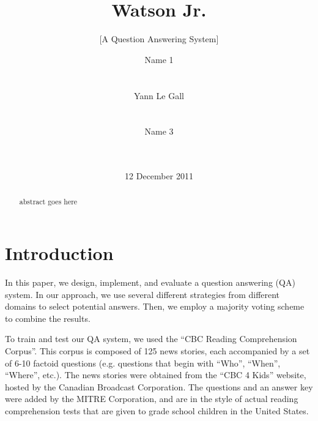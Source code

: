 \documentclass{acm_proc_article-sp}
\begin{document}
\title{Watson Jr.}
\subtitle{[A Question Answering System]}

\author{
\alignauthor Name 1 \\
       \\
       \\
\alignauthor Yann Le Gall\\
       \\
       \\
\alignauthor Name 3 \\
       \\
       \\
}

\date{12 December 2011}
\maketitle


\begin{abstract}
abstract goes here
\end{abstract}



\section{Introduction}

In this paper, we design, implement, and evaluate a question answering
(QA) system. In our approach, we use several different strategies from
different domains to select potential answers. Then, we employ a
majority voting scheme to combine the results.

To train and test our QA system, we used the ``CBC Reading
Comprehension Corpus''. This corpus is composed of 125 news stories,
each accompanied by a set of 6-10 factoid questions (e.g. questions
that begin with ``Who'', ``When'', ``Where'', etc.).
The news stories were obtained from the ``CBC 4 Kids'' website,
hosted by the Canadian Broadcast Corporation. The questions and an
answer key were added by the MITRE Corporation, and are in the style
of actual reading comprehension tests that are given to grade school
children in the United States.
\end{document}
